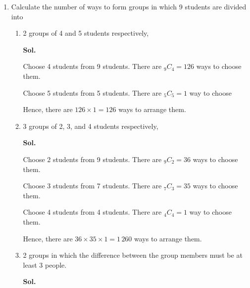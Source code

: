 \documentclass{report}
\newcommand\comb[2][^n]{{}_{#1}C_{#2}}
\newcommand{\sol}[1]{

      \noindent \textbf{Sol.}
}
\def\eos{\quad\hbox{\rlap{\hbox{\vrule depth 1.5pt height 2.6mm width 0.2mm \hskip 1mm \vrule height 2.6mm width 0.2mm}}{\vbox{\hrule height 0.2mm width 1.4mm \vskip 2.8mm \hrule depth 1.5pt height -0.35mm width 1.2mm}}}}
\begin{document}
\begin{multicols*}{2}
\begin{enumerate}
\begin{enumerate}
                              There are $\comb[5]{2} = 10$ ways to choose 2 books. $\eos$

                        \item Determine the number of ways to select 4 representatives from 10 students to
                              participate in the national debate competition. \sol{}

                              There are $\comb[10]{4} = 210$ ways to choose them. $\eos$
                  \end{enumerate}

            \item Calculate the number of ways to form groups in which 9 students are divided
                  into
                  \begin{enumerate}
                        \item 2 groups of 4 and 5 students respectively,
                              \sol{}

                              Choose 4 students from 9 students. There are $\comb[9]{4} = 126$ ways to choose
                              them.

                              Choose 5 students from 5 students. There are $\comb[5]{5} = 1$ way to choose

                              Hence, there are $126 \times 1 = 126$ ways to arrange them. $\eos$

                        \item 3 groups of 2, 3, and 4 students respectively,
                              \sol{}

                              Choose 2 students from 9 students. There are $\comb[9]{2} = 36$ ways to choose
                              them.

                              Choose 3 students from 7 students. There are $\comb[7]{3} = 35$ ways to choose
                              them.

                              Choose 4 students from 4 students. There are $\comb[4]{4} = 1$ way to choose
                              them.

                              Hence, there are $36 \times 35 \times 1 = 1\,260$ ways to arrange them. $\eos$

                        \item 2 groups in which the difference between the group members must be at least 3 people.
                              \sol{}


\end{enumerate}
\end{enumerate}
\end{multicols*}
\end{document}
